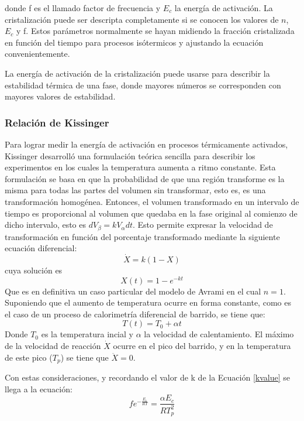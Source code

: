 \documentclass{article}
\theoremstyle{definition}
\theoremstyle{remark}
\begin{document}
donde f es el llamado factor de frecuencia y $E_c$ la energía de activación.
La cristalización puede ser descripta completamente si se conocen los valores de $n$, $E_c$ y f. Estos parámetros normalmente se hayan midiendo la fracción cristalizada en función del tiempo para procesos isótermicos y ajustando la ecuación convenientemente.

La energía de activación de la cristalización puede usarse para describir la estabilidad térmica de una fase, donde mayores números se corresponden con mayores valores de estabilidad.

\subsubsection{Relación de Kissinger}
Para lograr medir la energía de activación en procesos térmicamente activados, Kissinger desarrolló una formulación teórica sencilla para describir los experimentos en los cuales la temperatura aumenta a ritmo constante. Esta formulación se basa en que la probabilidad de que una región transforme es la misma para todas las partes del volumen sin transformar, esto es, es una transformación homogénea. Entonces, el volumen transformado en un intervalo de tiempo es proporcional al volumen que quedaba en la fase original al comienzo de dicho intervalo, esto es $dV_\beta = k V_\alpha dt$. Esto permite expresar la velocidad de transformación en función del porcentaje transformado mediante la siguiente ecuación diferencial:
\begin{equation}
	\dot{X} = k(1-X)
\end{equation}
cuya solución es
\begin{equation}
	X(t) = 1 - e^{-kt}
\end{equation}
Que es en definitiva un caso particular del modelo de Avrami en el cual $n=1$.
Suponiendo que el aumento de temperatura ocurre en forma constante, como es el caso de un proceso de calorimetría diferencial de barrido, se tiene que:
\begin{equation}
	T(t) = T_0+\alpha t
\end{equation}
Donde $T_0$ es la temperatura incial y $\alpha$ la velocidad de calentamiento. El máximo de la velocidad de reacción $\dot{X}$ ocurre en el pico del barrido, y en la temperatura de este pico ($T_p$) se tiene que $\ddot{X} = 0$.

Con estas consideraciones, y recordando el valor de k de la Ecuación \ref{kvalue} se llega a la ecuación:
\begin{equation}
	fe^{-\frac{E_c}{RT}} = \frac{\alpha E_c}{R T_p^2}
\end{equation}
\end{document}
